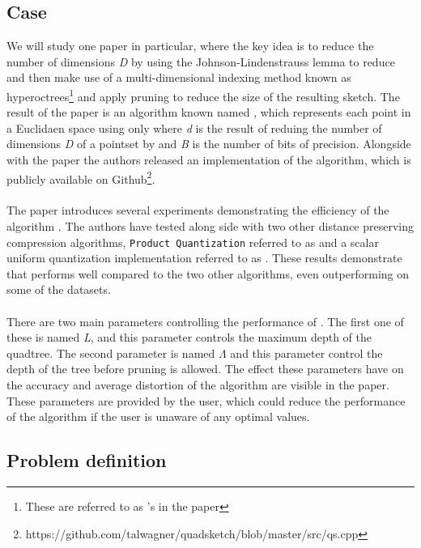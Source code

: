 \subsection{Case} %
We will study one paper in particular, where the key idea is to reduce the number of dimensions \textit{D} by using the Johnson-Lindenstrauss lemma to reduce and then make use of a multi-dimensional indexing method known as hyperoctrees\footnote{These are referred to as \qt{}'s in the paper} and apply pruning to reduce the size of the resulting sketch. The result of the paper is an algorithm known named \qs{}, which represents each point in a Euclidaen space using only  where \textit{d} is the result of reduing the number of dimensions \textit{D} of a pointset by  and \textit{B} is the number of bits of precision. Alongside with the paper the authors released an implementation of the algorithm, which is publicly available on Github\footnote{https://github.com/talwagner/quadsketch/blob/master/src/qs.cpp}. 
\\
\\
The paper introduces several experiments demonstrating the efficiency of the algorithm \qs{}. The authors have tested \qs{} along side with two other distance preserving compression algorithms, \texttt{Product Quantization} referred to as \pq{} and a scalar uniform quantization implementation referred to as \gr{}. These results demonstrate that \qs{} performs well compared to the two other algorithms, even outperforming \pq{} on some of the datasets. 
\\
\\
There are two main parameters controlling the performance of \qs{}. The first one of these is named \textit{L}, and this parameter controls the maximum depth of the quadtree. The second parameter is named $\Lambda$ and this parameter control the depth of the tree before pruning is allowed. The effect these parameters have on the accuracy and average distortion of the algorithm are visible in the paper. These parameters are provided by the user, which could reduce the performance of the algorithm if the user is unaware of any optimal values.
\subsection{Problem definition} %
